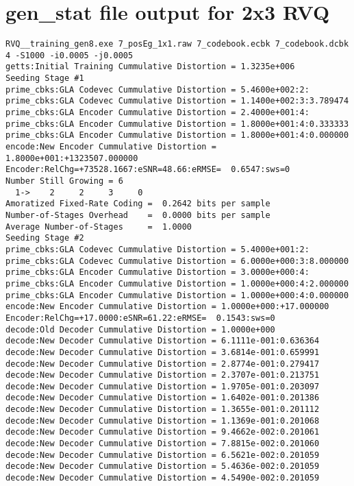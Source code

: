 \clearpage
\newpage
\appendix
\section{gen\_stat file output for 2x3 RVQ}
\label{gen_stat}
\scriptsize
\begin{verbatim}
RVQ__training_gen8.exe 7_posEg_1x1.raw 7_codebook.ecbk 7_codebook.dcbk 4 -S1000 -i0.0005 -j0.0005 
getts:Initial Training Cummulative Distortion = 1.3235e+006
Seeding Stage #1
prime_cbks:GLA Codevec Cummulative Distortion = 5.4600e+002:2:
prime_cbks:GLA Codevec Cummulative Distortion = 1.1400e+002:3:3.789474
prime_cbks:GLA Encoder Cummulative Distortion = 2.4000e+001:4:
prime_cbks:GLA Encoder Cummulative Distortion = 1.8000e+001:4:0.333333
prime_cbks:GLA Encoder Cummulative Distortion = 1.8000e+001:4:0.000000
encode:New Encoder Cummulative Distortion = 1.8000e+001:+1323507.000000
Encoder:RelChg=+73528.1667:eSNR=48.66:eRMSE=  0.6547:sws=0
Number Still Growing = 6
  1->    2     2     3     0 
Amoratized Fixed-Rate Coding =  0.2642 bits per sample
Number-of-Stages Overhead    =  0.0000 bits per sample
Average Number-of-Stages     =  1.0000
Seeding Stage #2
prime_cbks:GLA Codevec Cummulative Distortion = 5.4000e+001:2:
prime_cbks:GLA Codevec Cummulative Distortion = 6.0000e+000:3:8.000000
prime_cbks:GLA Encoder Cummulative Distortion = 3.0000e+000:4:
prime_cbks:GLA Encoder Cummulative Distortion = 1.0000e+000:4:2.000000
prime_cbks:GLA Encoder Cummulative Distortion = 1.0000e+000:4:0.000000
encode:New Encoder Cummulative Distortion = 1.0000e+000:+17.000000
Encoder:RelChg=+17.0000:eSNR=61.22:eRMSE=  0.1543:sws=0
decode:Old Decoder Cummulative Distortion = 1.0000e+000
decode:New Decoder Cummulative Distortion = 6.1111e-001:0.636364
decode:New Decoder Cummulative Distortion = 3.6814e-001:0.659991
decode:New Decoder Cummulative Distortion = 2.8774e-001:0.279417
decode:New Decoder Cummulative Distortion = 2.3707e-001:0.213751
decode:New Decoder Cummulative Distortion = 1.9705e-001:0.203097
decode:New Decoder Cummulative Distortion = 1.6402e-001:0.201386
decode:New Decoder Cummulative Distortion = 1.3655e-001:0.201112
decode:New Decoder Cummulative Distortion = 1.1369e-001:0.201068
decode:New Decoder Cummulative Distortion = 9.4662e-002:0.201061
decode:New Decoder Cummulative Distortion = 7.8815e-002:0.201060
decode:New Decoder Cummulative Distortion = 6.5621e-002:0.201059
decode:New Decoder Cummulative Distortion = 5.4636e-002:0.201059
decode:New Decoder Cummulative Distortion = 4.5490e-002:0.201059

\end{verbatim}
